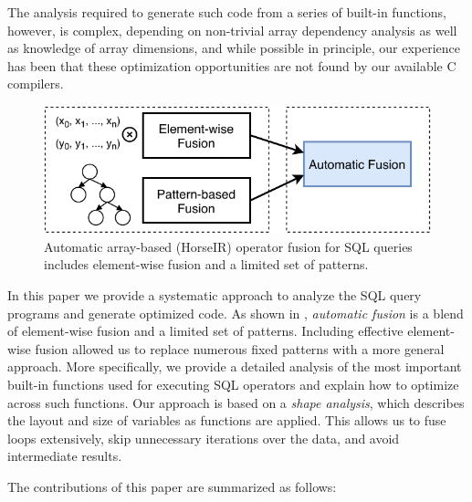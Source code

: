 \noindent{}The analysis required to generate such code from a series of built-in functions, however, is complex,
depending on non-trivial array dependency analysis as well as knowledge of array dimensions, and 
while possible in principle, our experience has been that these optimization opportunities are not found by our available C compilers.


\begin{figure}[htbp]
\centering
\includegraphics[width=.95\columnwidth]{./src/figure/basic-idea.pdf}
\caption{Automatic array-based (HorseIR) operator fusion for SQL queries includes element-wise fusion and a limited set of patterns.}
\label{fig:fusion_idea}
\end{figure}

In this paper we provide a systematic approach to analyze the SQL query programs
and generate optimized code. As shown in ,
\textit{automatic fusion} is a blend of element-wise fusion and a limited set of
patterns. Including effective element-wise fusion allowed us to replace numerous fixed
patterns with a more general approach. More specifically, we provide a detailed
analysis of the most important built-in functions used for executing SQL operators
and explain how to optimize across such functions. Our approach is based on a
\textit{shape analysis}, which describes the layout and size of variables as
functions are applied. This allows us to fuse loops extensively, skip unnecessary
iterations over the data, and avoid intermediate results.  

The contributions of this paper are summarized as follows:

